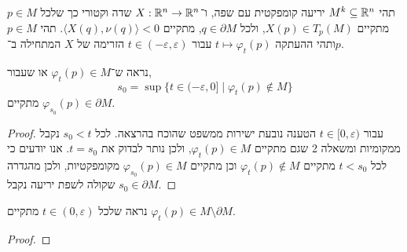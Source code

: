\question{}
תהי $M^k \subseteq \mathbb{R}^n$ יריעה קומפקטית עם שפה, ו־$X : \mathbb{R}^n \to \mathbb{R}^n$ שדה וקטורי כך שלכל $p \in M$ מתקיים $X(p) \in T_p(M)$,
ולכל $q \in \partial M$, מתקיים $\langle X(q), \nu(q) \rangle < 0$.
תהי $p \in M$ ותהי ההעתקה $t \mapsto \varphi_t(p)$ עבור $t \in (-\varepsilon, \varepsilon)$ הזרימה של $X$ המתחילה ב־$p$.

\subquestion{}
נראה ש־$\varphi_t(p) \in M$ או שעבור,
\[
	s_0
	= \sup\{ t \in (-\varepsilon, 0] \mid \varphi_t(p) \notin M \}
\]
מתקיים $\varphi_{s_0}(p) \in \partial M$.
\begin{proof}
	עבור $t \in [0, \varepsilon)$ הטענה נובעת ישירות ממשפט שהוכח בהרצאה.
	לכל $s_0 < t$ נקבל ממקומיות ומשאלה 2 שגם מתקיים $\varphi_t(p) \in M$, ולכן נותר לבדוק את $t = s_0$.
	אנו יודעים כי לכל $t < s_0$ מתקיים $\varphi_t(p) \notin M$ וכן מתקיים $\varphi_{s_0}(p) \in M$ מקומפקטיות, ולכן מהגדרה שקולה לשפת יריעה נקבל $s_0 \in \partial M$.
\end{proof}

\subquestion{}
נראה שלכל $t \in (0, \varepsilon)$ מתקיים $\varphi_t(p) \in M \setminus \partial M$.
\begin{proof}
	
\end{proof}


